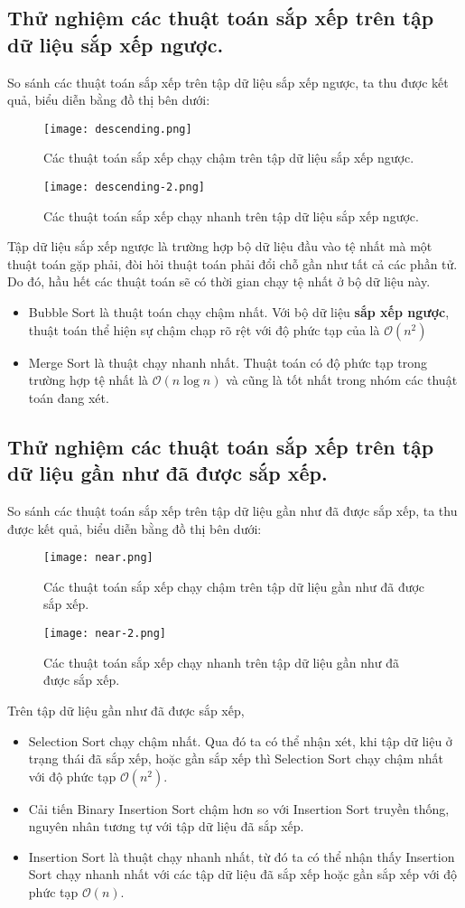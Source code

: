 \documentclass[]{article}
\begin{document}
\subsection{Thử nghiệm các thuật toán sắp xếp trên tập dữ liệu sắp xếp ngược.}
So sánh các thuật toán sắp xếp trên tập dữ liệu sắp xếp ngược, ta thu được kết quả, biểu diễn bằng đồ thị bên dưới:
\begin{figure}[H]
\centering
\texttt{[image: descending.png]}
\caption{Các thuật toán sắp xếp chạy chậm trên tập dữ liệu sắp xếp ngược.}
\end{figure}
\begin{figure}[H]
\centering
\texttt{[image: descending-2.png]}
\caption{Các thuật toán sắp xếp chạy nhanh trên tập dữ liệu sắp xếp ngược.}
\end{figure}
Tập dữ liệu sắp xếp ngược là trường hợp bộ dữ liệu đầu vào tệ nhất mà một thuật toán gặp phải, đòi hỏi thuật toán phải đổi chỗ gần như tất cả các phần tử. Do đó, hầu hết các thuật toán sẽ có thời gian chạy tệ nhất ở bộ dữ liệu này.
\begin{itemize}
\item Bubble Sort là thuật toán chạy chậm nhất. Với bộ dữ liệu \textbf{sắp xếp ngược}, thuật toán thể hiện sự chậm chạp rõ rệt với độ phức tạp của là $\mathcal{O}(n^2)$
\item Merge Sort là thuật chạy nhanh nhất. Thuật toán có độ phức tạp trong trường hợp tệ nhất là $\mathcal{O}(n \log n)$ và cũng là tốt nhất trong nhóm các thuật toán đang xét.
\end{itemize}

\subsection{Thử nghiệm các thuật toán sắp xếp trên tập dữ liệu gần như đã được sắp xếp.}
So sánh các thuật toán sắp xếp trên tập dữ liệu gần như đã được sắp xếp, ta thu được kết quả, biểu diễn bằng đồ thị bên dưới:
\begin{figure}[H]
\centering
\texttt{[image: near.png]}
\caption{Các thuật toán sắp xếp chạy chậm trên tập dữ liệu gần như đã được sắp xếp.}
\end{figure}
\begin{figure}[H]
\centering
\texttt{[image: near-2.png]}
\caption{Các thuật toán sắp xếp chạy nhanh trên tập dữ liệu gần như đã được sắp xếp.}
\end{figure}
Trên tập dữ liệu gần như đã được sắp xếp,
\begin{itemize}
\item Selection Sort chạy chậm nhất. Qua đó ta có thể nhận xét, khi tập dữ liệu ở trạng thái đã sắp xếp, hoặc gần sắp xếp thì Selection Sort chạy chậm nhất với độ phức tạp $\mathcal{O}(n^2)$.
\item Cải tiến Binary Insertion Sort chậm hơn so với Insertion Sort truyền thống, nguyên nhân tương tự với tập dữ liệu đã sắp xếp.
\item Insertion Sort là thuật chạy nhanh nhất, từ đó ta có thể nhận thấy Insertion Sort chạy nhanh nhất với các tập dữ liệu đã sắp xếp hoặc gần sắp xếp với độ phức tạp $\mathcal{O}(n)$.
\end{itemize}
\end{document}
